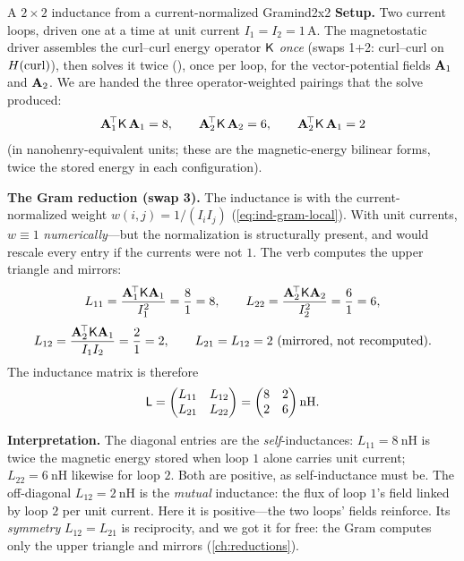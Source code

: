 \begin{workedexample}{A $2\times2$ inductance from a current-normalized Gram}{ind2x2}
\textbf{Setup.} Two current loops, driven one at a time at unit current
$I_1=I_2=1\,\si{\ampere}$. The magnetostatic driver assembles the curl--curl energy
operator $\mathsf{K}$ \emph{once} (swaps 1+2: curl--curl on $H(\mathrm{curl})$), then solves it
twice (), once per loop, for the vector-potential fields $\mathbf{A}_1$
and $\mathbf{A}_2$. We are handed the three operator-weighted pairings that the solve
produced:
\[
  \mathbf{A}_1^{\!\top}\mathsf{K}\,\mathbf{A}_1 = 8,\qquad
  \mathbf{A}_2^{\!\top}\mathsf{K}\,\mathbf{A}_2 = 6,\qquad
  \mathbf{A}_2^{\!\top}\mathsf{K}\,\mathbf{A}_1 = 2
\]
(in nanohenry-equivalent units; these are the magnetic-energy bilinear forms, twice
the stored energy in each configuration).

\textbf{The Gram reduction (swap 3).} The inductance is  with the
current-normalized weight $w(i,j)=1/(I_iI_j)$ (\cref{eq:ind-gram-local}). With unit
currents, $w\equiv 1$ \emph{numerically}---but the normalization is structurally
present, and would rescale every entry if the currents were not $1$. The verb
computes the upper triangle and mirrors:
\[
  L_{11} = \frac{\mathbf{A}_1^{\!\top}\mathsf{K}\mathbf{A}_1}{I_1^2} = \frac{8}{1} = 8,\qquad
  L_{22} = \frac{\mathbf{A}_2^{\!\top}\mathsf{K}\mathbf{A}_2}{I_2^2} = \frac{6}{1} = 6,
\]
\[
  L_{12} = \frac{\mathbf{A}_2^{\!\top}\mathsf{K}\mathbf{A}_1}{I_1 I_2} = \frac{2}{1} = 2,
  \qquad L_{21}=L_{12}=2 \ \text{(mirrored, not recomputed).}
\]
The inductance matrix is therefore
\[
  \mat{L} =
  \begin{pmatrix} L_{11} & L_{12}\\ L_{21} & L_{22} \end{pmatrix}
  = \begin{pmatrix} 8 & 2\\ 2 & 6 \end{pmatrix}\si{\nano\henry}.
\]

\textbf{Interpretation.} The diagonal entries are the \emph{self}-inductances:
$L_{11}=\SI{8}{\nano\henry}$ is twice the magnetic energy stored when loop $1$ alone
carries unit current; $L_{22}=\SI{6}{\nano\henry}$ likewise for loop $2$. Both are
positive, as self-inductance must be. The off-diagonal $L_{12}=\SI{2}{\nano\henry}$
is the \emph{mutual} inductance: the flux of loop $1$'s field linked by loop $2$ per
unit current. Here it is positive---the two loops' fields reinforce. Its
\emph{symmetry} $L_{12}=L_{21}$ is reciprocity, and we got it for free: the Gram
computes only the upper triangle and mirrors (\cref{ch:reductions}).


\end{workedexample}

